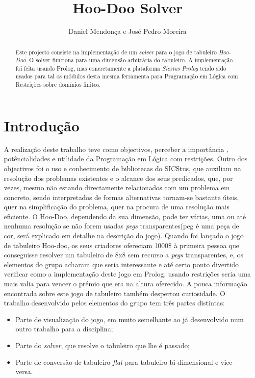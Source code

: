 \documentclass{llncs}
\begin{document}
\title{Hoo-Doo Solver}

\author{Daniel Mendon\c{c}a e Jos\'{e} Pedro Moreira}


\maketitle
%
\begin{abstract}
Este projecto consiste na implementa\c{c}\~{a}o de um \textit{solver} para o jogo de tabuleiro \textit{Hoo-Doo}. O solver funciona para uma dimens\~{a}o arbitr\'{a}ria do tabuleiro. A implementa\c{c}\~{a}o foi feita usando Prolog, mas concretamente a plataforma \emph{Sicstus Prolog}  tendo sido usados para tal os m\'{o}dulos desta mesma ferramenta para Pragrama\c{c}\~{a}o em L\'{o}gica com Restri\c{c}\~{o}es sobre dom\'{i}nios finitos.
\end{abstract}
%
\section{Introdu\c{c}\~{a}o}
%
A realiza\c{c}\~{a}o deste trabalho teve como objectivos, perceber a import\^{a}ncia , pot\^{e}ncialidades e utilidade da Programa\c{c}\~{a}o em L\'{o}gica com restri\c{c}\~{o}es. Outro dos objectivos foi o uso e conhecimento de bibliotecas do SICStus, que auxiliam na resolu\c{c}\~{a}o dos problemas existentes e o alcance dos seus predicados, que, por vezes, mesmo n\~{a}o estando directamente relacionados com um problema em concreto, sendo interpretados de formas alternativas tornam-se bastante \'{u}teis, quer na simplifica\c{c}\~{a}o do problema, quer na procura de uma resolu\c{c}\~{a}o mais eficiente.
O Hoo-Doo, dependendo da sua dimens\~{a}o, pode ter v\'{a}rias, uma ou at\'{e} nenhuma resolu\c{c}\~{a}o se n\~{a}o forem usadas \emph{pegs} transparentes(peg \'{e} uma pe\c{c}a de cor, ser\'{a} explicado em detalhe na descri\c{c}\~{a}o do jogo). Quando foi lan\c{c}ado o jogo de tabuleiro Hoo-doo, os seus criadores ofereciam 1000\$ \`{a} primeira pessoa que conseguisse resolver um tabuleiro de 8x8 sem recurso a \emph{pegs} transparentes, e, os elementos do grupo acharam que seria interessante e at\'{e} certo ponto divertido verificar como a implementa\c{c}\~{a}o deste jogo em Prolog, usando restri\c{c}\~{o}es seria uma mais valia para vencer o pr\'{e}mio que era na altura oferecido. A pouca informa\c{c}\~{a}o encontrada sobre este jogo de tabuleiro tamb\'{e}m despertou curiosidade.
 O trabalho desenvolvido pelos elementos do grupo tem tr\^{e}s partes distintas:
 \begin{itemize}
\item Parte de visualiza\c{c}\~{a}o do jogo, em muito semelhante ao j\'{a} desenvolvido num outro trabalho para a disciplina;
\item Parte do \emph{solver}, que resolve o tabuleiro que lhe \'{e} passado;
\item Parte de convers\~{a}o de tabuleiro \emph{flat} para tabuleiro bi-dimensional e vice-versa.
\end{itemize}
\end{document}
